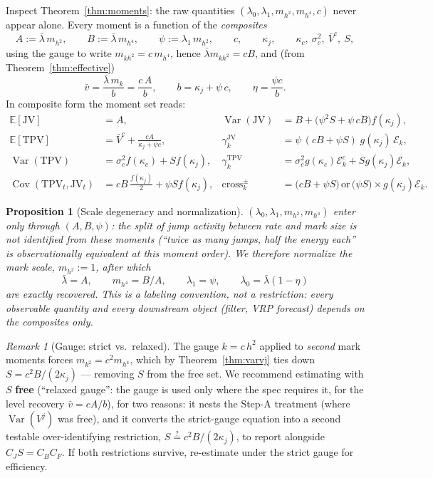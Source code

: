 \documentclass[11pt]{report}
\newtheorem{proposition}[theorem]{Proposition}
\theoremstyle{definition}
\theoremstyle{remark}
\newtheorem{remark}[theorem]{Remark}
\newcommand{\E}{\mathbb{E}}
\newcommand{\Var}{\operatorname{Var}}
\newcommand{\Cov}{\operatorname{Cov}}
\newcommand{\TPV}{\mathrm{TPV}}
\newcommand{\JV}{\mathrm{JV}}
\newcommand{\mk}{m_{k}}
\newcommand{\mkk}{m_{k^{2}}}
\newcommand{\mh}{m_{h^{2}}}
\newcommand{\mhh}{m_{h^{4}}}
\newcommand{\mkh}{m_{kh^{2}}}
\begin{document}
Inspect Theorem~\ref{thm:moments}: the raw quantities
$(\lambda_{0},\lambda_{1},\mh,\mhh,c)$ never appear alone. Every moment is a
function of the \emph{composites}
\[
A:=\bar\lambda\,\mh,\qquad
B:=\bar\lambda\,\mhh,\qquad
\psi:=\lambda_{1}\,\mh,\qquad
c,\qquad \kappa_{j},\qquad \kappa_{c},\ \sigma_{c}^{2},\ \bar V^{c},\ S,
\]
using the gauge to write $\mkh=c\,\mhh$, hence
$\bar\lambda\mkh=cB$, and (from Theorem~\ref{thm:effective})
\[
\bar v=\frac{\bar\lambda\,\mk}{b}=\frac{c\,A}{b},
\qquad
b=\kappa_{j}+\psi\,c,
\qquad
\eta=\frac{\psi c}{b}.
\]
In composite form the moment set reads:
\begin{align*}
\E[\JV]&=A, &
\Var(\JV)&=B+\big(\psi^{2}S+\psi\,cB\big)f(\kappa_{j}),\\
\E[\TPV]&=\bar V^{c}+\tfrac{cA}{\kappa_{j}+\psi c}, &
\gamma^{\JV}_{k}&=\psi\,(cB+\psi S)\;g(\kappa_{j})\,\mathcal{E}_{k},\\
\Var(\TPV)&=\sigma_{c}^{2}f(\kappa_{c})+S f(\kappa_{j}), &
\gamma^{\TPV}_{k}&=\sigma_{c}^{2}g(\kappa_{c})\mathcal{E}^{c}_{k}+S g(\kappa_{j})\mathcal{E}_{k},\\
\Cov(\TPV_t,\JV_t)&=cB\,\tfrac{f(\kappa_j)}{2}+\psi S f(\kappa_{j}), &
\text{cross}^{\pm}_{k}&=\big(cB+\psi S\big)\,\text{or}\,\big(\psi S\big)
\times g(\kappa_{j})\mathcal{E}_{k}.
\end{align*}

\begin{proposition}[Scale degeneracy and normalization]\label{prop:ident}
$(\lambda_{0},\lambda_{1},\mh,\mhh)$ enter only through $(A,B,\psi)$: the
split of jump activity between \emph{rate} and \emph{mark size} is not
identified from these moments (``twice as many jumps, half the energy each''
is observationally equivalent at this moment order). We therefore normalize
the mark scale, $\mh:=1$, after which
\[
\bar\lambda=A,\qquad \mhh=B/A,\qquad \lambda_{1}=\psi,
\qquad \lambda_{0}=\bar\lambda(1-\eta)
\]
are exactly recovered. This is a labeling convention, not a restriction:
every observable quantity and every downstream object (filter, VRP forecast)
depends on the composites only.
\end{proposition}

\begin{remark}[Gauge: strict vs.\ relaxed]\label{rem:gauge}
The gauge $k=c\,h^{2}$ applied to \emph{second} mark moments forces
$\mkk=c^{2}\mhh$, which by Theorem~\ref{thm:varvj} ties down
$S=c^{2}B/(2\kappa_{j})$ --- removing $S$ from the free set. We recommend
estimating with $S$ \textbf{free} (``relaxed gauge'': the gauge is used only
where the spec requires it, for the level recovery $\bar v=cA/b$), for two
reasons: it nests the Step-A treatment (where $\Var(V^j)$ was free), and it
converts the strict-gauge equation into a second testable over-identifying
restriction, $S\stackrel{?}{=}c^{2}B/(2\kappa_{j})$, to report alongside
$C_{J}S=C_{B}C_{F}$. If both restrictions survive, re-estimate under the
strict gauge for efficiency.
\end{remark}
\end{document}

